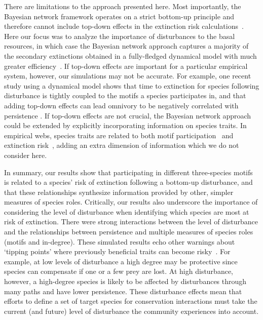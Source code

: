\documentclass[12pt]{article}
\begin{document}
\begin{spacing}{2.0}
    
    There are limitations to the approach presented here.
    Most importantly, the Bayesian network framework operates on a strict bottom-up principle and therefore cannot include top-down effects in the extinction risk calculations~\citep{Eklof2013}. 
    Here our focus was to analyze the importance of disturbances to the basal resources, in which case the Bayesian network approach captures a majority of the secondary extinctions obtained in a fully-fledged dynamical model with much greater efficiency~\citep{Eklof2013}.
    If top-down effects are important for a particular empirical system, however, our simulations may not be accurate. 
    For example, one recent study using a dynamical model shows that time to extinction for species following disturbance is tightly coupled to the motifs a species participates in, and that adding top-down effects can lead omnivory to be negatively correlated with persistence \citep{Cirtwill2021_inprep}. 
    If top-down effects are not crucial, the Bayesian network approach could be extended by explicitly incorporating information on species traits.
    In empirical webs, species traits are related to both motif participation~\citep{cirtwill2018feeding} and extinction risk~\citep{Brose2017, curtsdotter2011robustness, Cardillo2005, Purvis2000},
    adding an extra dimension of information which we do not consider here.
    
    In summary, our results show that participating in different three-species motifs is related to a species' risk of extinction following a bottom-up disturbance, and that these relationships synthesize information provided by other, simpler measures of species roles.
    Critically, our results also underscore the importance of considering the level of disturbance when identifying which species are most at risk of extinction.
    There were strong interactions between the level of disturbance and the relationships between persistence and multiple measures of species roles (motifs and in-degree).
    These simulated results echo other warnings about `tipping points' where previously beneficial traits can become risky~\citep{Latty2019,Golubski2016,Tylianakis2014}.
    For example, at low levels of disturbance a high degree may be protective since species can compensate if one or a few prey are lost. 
    At high disturbance, however, a high-degree species is likely to be affected by disturbances through many paths and have lower persistence.
    These disturbance effects mean that efforts to define a set of target species for conservation interactions must take the current (and future) level of disturbance the community experiences into account.
    

\end{spacing}
\end{document}
